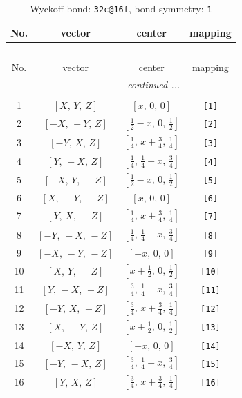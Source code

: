 \documentclass[fleqn,8pt]{jsarticle}
\begin{document}
\begin{longtable}{cccc}
\caption{Wyckoff bond: {\tt 32c@16f}, bond symmetry: {\tt 1}}
 \\
 \hline \hline
No. & vector & center & mapping \\ \hline \endfirsthead

\multicolumn{3}{l}{\tablename\ \thetable{}} \\
 \hline \hline
No. & vector & center & mapping \\ \hline \endhead

 \hline \hline
\multicolumn{3}{r}{\footnotesize\it continued ...} \\ \endfoot

 \hline \hline
\multicolumn{3}{r}{} \\ \endlastfoot

1 & $\left[ X,\, Y,\, Z \right]$ & $\left[ x,\, 0,\, 0 \right]$ & {\tt [1]} \\ \hline
2 & $\left[ - X,\, - Y,\, Z \right]$ & $\left[ \frac{1}{2} - x,\, 0,\, \frac{1}{2} \right]$ & {\tt [2]} \\ \hline
3 & $\left[ - Y,\, X,\, Z \right]$ & $\left[ \frac{1}{4},\, x + \frac{3}{4},\, \frac{1}{4} \right]$ & {\tt [3]} \\ \hline
4 & $\left[ Y,\, - X,\, Z \right]$ & $\left[ \frac{1}{4},\, \frac{1}{4} - x,\, \frac{3}{4} \right]$ & {\tt [4]} \\ \hline
5 & $\left[ - X,\, Y,\, - Z \right]$ & $\left[ \frac{1}{2} - x,\, 0,\, \frac{1}{2} \right]$ & {\tt [5]} \\ \hline
6 & $\left[ X,\, - Y,\, - Z \right]$ & $\left[ x,\, 0,\, 0 \right]$ & {\tt [6]} \\ \hline
7 & $\left[ Y,\, X,\, - Z \right]$ & $\left[ \frac{1}{4},\, x + \frac{3}{4},\, \frac{1}{4} \right]$ & {\tt [7]} \\ \hline
8 & $\left[ - Y,\, - X,\, - Z \right]$ & $\left[ \frac{1}{4},\, \frac{1}{4} - x,\, \frac{3}{4} \right]$ & {\tt [8]} \\ \hline
9 & $\left[ - X,\, - Y,\, - Z \right]$ & $\left[ - x,\, 0,\, 0 \right]$ & {\tt [9]} \\ \hline
10 & $\left[ X,\, Y,\, - Z \right]$ & $\left[ x + \frac{1}{2},\, 0,\, \frac{1}{2} \right]$ & {\tt [10]} \\ \hline
11 & $\left[ Y,\, - X,\, - Z \right]$ & $\left[ \frac{3}{4},\, \frac{1}{4} - x,\, \frac{3}{4} \right]$ & {\tt [11]} \\ \hline
12 & $\left[ - Y,\, X,\, - Z \right]$ & $\left[ \frac{3}{4},\, x + \frac{3}{4},\, \frac{1}{4} \right]$ & {\tt [12]} \\ \hline
13 & $\left[ X,\, - Y,\, Z \right]$ & $\left[ x + \frac{1}{2},\, 0,\, \frac{1}{2} \right]$ & {\tt [13]} \\ \hline
14 & $\left[ - X,\, Y,\, Z \right]$ & $\left[ - x,\, 0,\, 0 \right]$ & {\tt [14]} \\ \hline
15 & $\left[ - Y,\, - X,\, Z \right]$ & $\left[ \frac{3}{4},\, \frac{1}{4} - x,\, \frac{3}{4} \right]$ & {\tt [15]} \\ \hline
16 & $\left[ Y,\, X,\, Z \right]$ & $\left[ \frac{3}{4},\, x + \frac{3}{4},\, \frac{1}{4} \right]$ & {\tt [16]} \\
\end{longtable}
\end{document}
